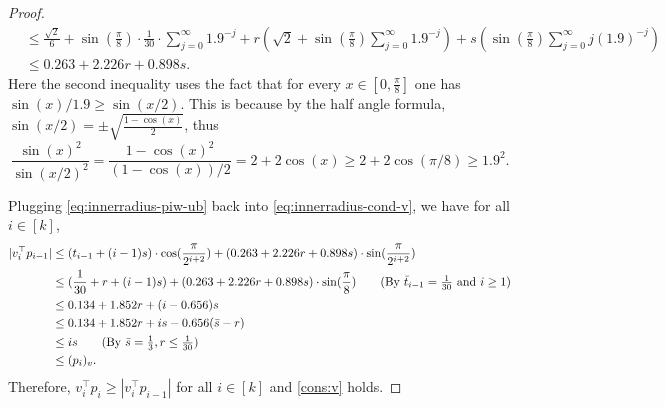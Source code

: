 \documentclass{article}\usepackage[a4paper,margin=20mm]{geometry}
\begin{document}
\begin{proof}
\begin{align}
        &\leq \frac{\sqrt{2}}{6} + \sin(\frac{\pi}{8}) \cdot 
    \frac{1}{30} \cdot \sum_{j=0}^{\infty} 1.9^{-j} + r\left(\sqrt{2} + \sin(\frac{\pi}{8})\sum_{j=0}^{\infty} 1.9^{-j}\right) +  s\left(\sin(\frac{\pi}{8}) \sum_{j=0}^{\infty} j(1.9)^{-j} \right) \nonumber \\
        &\leq 0.263 + 2.226r + 0.898s. \label{eq:innerradius-piw-ub}
    \end{align}
    Here the second inequality uses the fact that for every $x \in [0, \frac{\pi}{8}]$ one has $\sin(x)/1.9 \geq \sin(x/2)$.
    This is because by the half angle formula, $\sin(x/2) = \pm\sqrt{\frac{1-\cos(x)}{2}}$, thus
    \[
        \frac{\sin(x)^2}{\sin(x/2)^2} = \frac{1-\cos(x)^2}{(1-\cos(x))/2} = 2 + 2\cos(x) \geq 2 + 2\cos(\pi/8) \geq 1.9^2.
    \]

    Plugging \eqref{eq:innerradius-piw-ub} back into \eqref{eq:innerradius-cond-v}, we have for all $i \in [k]$,
    \begin{align*}
        |v_i^\top p_{i-1}| &\leq (t_{i-1} + (i-1)s) \cdot \cos(\frac{\pi}{2^{i + 2}}) +  (0.263 + 2.226r + 0.898s) \cdot \sin(\frac{\pi}{2^{i+2}}) \\
        &\leq ( \frac{1}{30} + r + (i-1)s) + ( 0.263 + 2.226r + 0.898s) \cdot \sin(\frac{\pi}{8}) \tag{By $\bar{t}_{i-1} = \frac{1}{30}$ and $i \geq 1$} \\
        &\leq 0.134 + 1.852r + (i - 0.656)s \\
        &\leq 0.134 + 1.852r + is - 0.656(\bar{s} - r)  \\
        &\leq is \tag{By $\bar{s} = \frac{1}{3}, r\leq \frac{1}{30}$} \\
        &\leq (p_i)_v.
    \end{align*}
    Therefore, $v_i^\top p_i \geq |v_i^\top p_{i-1}|$ for all $i \in [k]$ and \eqref{cons:v} holds.
    

\end{proof}
\end{document}
